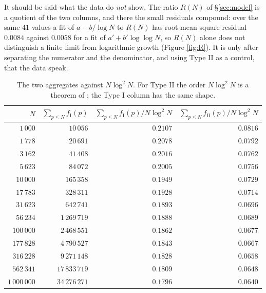 \documentclass[11pt,reqno]{amsart}
\theoremstyle{plain}
\theoremstyle{definition}
\numberwithin{equation}{section}
\newcommand{\fI}{f_{\mathrm{I}}}
\newcommand{\fII}{f_{\mathrm{II}}}
\begin{document}
It should be said what the data do \emph{not} show. The ratio $R(N)$ of
\S\ref{sec:model} is a quotient of the two columns, and there the small residuals
compound: over the same $41$ values a fit of $a-b/\log N$ to $R(N)$ has
root-mean-square residual $0.0084$ against $0.0058$ for a fit of
$a'+b'\log\log N$, so $R(N)$ alone does not distinguish a finite limit from
logarithmic growth (Figure \ref{fig:R}). It is only after separating the numerator and
the denominator, and using Type II as a control, that the data speak.

\begin{table}[t]
\centering\small
\begin{tabular}{rrrr}
\toprule
$N$ & $\sum_{p\le N}\fI(p)$ & $\sum_{p\le N}\fI(p)\big/N\log^{2}N$
& $\sum_{p\le N}\fII(p)\big/N\log^{2}N$\\
\midrule
$1\,000$ & $10\,056$ & $0.2107$ & $0.0816$\\
$1\,778$ & $20\,691$ & $0.2078$ & $0.0792$\\
$3\,162$ & $41\,408$ & $0.2016$ & $0.0762$\\
$5\,623$ & $84\,072$ & $0.2005$ & $0.0756$\\
$10\,000$ & $165\,358$ & $0.1949$ & $0.0729$\\
$17\,783$ & $328\,311$ & $0.1928$ & $0.0714$\\
$31\,623$ & $642\,741$ & $0.1893$ & $0.0696$\\
$56\,234$ & $1\,269\,719$ & $0.1888$ & $0.0689$\\
$100\,000$ & $2\,468\,551$ & $0.1862$ & $0.0677$\\
$177\,828$ & $4\,790\,527$ & $0.1843$ & $0.0667$\\
$316\,228$ & $9\,271\,148$ & $0.1828$ & $0.0658$\\
$562\,341$ & $17\,833\,719$ & $0.1809$ & $0.0648$\\
$1\,000\,000$ & $34\,276\,271$ & $0.1796$ & $0.0640$\\
\bottomrule
\end{tabular}
\caption{The two aggregates against $N\log^{2}N$. For Type II the order
$N\log^{2}N$ is a theorem of \cite{ElsholtzTao}; the Type I column has the same
shape.}
\label{tab:loglog}
\end{table}
\end{document}
